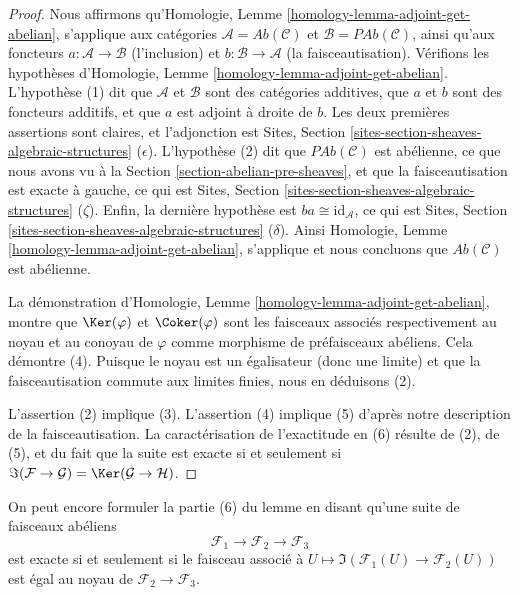 \begin{proof}
Nous affirmons qu'Homologie, Lemme
\ref{homology-lemma-adjoint-get-abelian}, s'applique aux catégories
$\mathcal{A} = \textit{Ab}(\mathcal{C})$ et
$\mathcal{B} = \textit{PAb}(\mathcal{C})$, ainsi qu'aux foncteurs
$a : \mathcal{A} \to \mathcal{B}$ (l'inclusion) et
$b : \mathcal{B} \to \mathcal{A}$ (la faisceautisation). Vérifions les
hypothèses d'Homologie, Lemme \ref{homology-lemma-adjoint-get-abelian}.
L'hypothèse (1) dit que $\mathcal{A}$ et $\mathcal{B}$ sont des
catégories additives, que $a$ et $b$ sont des foncteurs additifs, et que $a$
est adjoint à droite de $b$. Les deux premières assertions sont claires, et
l'adjonction est Sites, Section
\ref{sites-section-sheaves-algebraic-structures} ($\epsilon$). L'hypothèse
(2) dit que $\textit{PAb}(\mathcal{C})$ est abélienne, ce que nous avons vu à
la Section \ref{section-abelian-pre-sheaves}, et que la faisceautisation est
exacte à gauche, ce qui est Sites, Section
\ref{sites-section-sheaves-algebraic-structures} ($\zeta$). Enfin, la dernière
hypothèse est $ba \cong \text{id}_\mathcal{A}$, ce qui est Sites, Section
\ref{sites-section-sheaves-algebraic-structures} ($\delta$). Ainsi Homologie,
Lemme \ref{homology-lemma-adjoint-get-abelian}, s'applique et nous concluons
que $\textit{Ab}(\mathcal{C})$ est abélienne.

\medskip\noindent
La démonstration d'Homologie, Lemme
\ref{homology-lemma-adjoint-get-abelian}, montre que $\Ker(\varphi)$ et
$\Coker(\varphi)$ sont les faisceaux associés respectivement au noyau et au
conoyau de $\varphi$ comme morphisme de préfaisceaux abéliens. Cela démontre
(4). Puisque le noyau est un égalisateur (donc une limite) et que la
faisceautisation commute aux limites finies, nous en déduisons (2).

\medskip\noindent
L'assertion (2) implique (3). L'assertion (4) implique (5) d'après notre
description de la faisceautisation. La caractérisation de l'exactitude en (6)
résulte de (2), de (5), et du fait que la suite est exacte si et seulement si
$\Im(\mathcal{F} \to \mathcal{G}) =
\Ker(\mathcal{G} \to \mathcal{H})$.
\end{proof}

\noindent
On peut encore formuler la partie (6) du lemme en disant qu'une suite de
faisceaux abéliens
$$
\mathcal{F}_1 \longrightarrow
\mathcal{F}_2 \longrightarrow
\mathcal{F}_3
$$
est exacte si et seulement si le faisceau associé à
$U \mapsto \Im(\mathcal{F}_1(U) \to \mathcal{F}_2(U))$
est égal au noyau de $\mathcal{F}_2 \to \mathcal{F}_3$.

